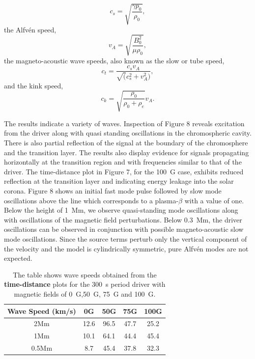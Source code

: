 \documentclass[physics,article,submit,pdftex,moreauthors]{Definitions/mdpi}
\begin{document}
\begin{equation}
 c_{s}  =    \sqrt{\frac{\gamma p_0}{\rho_0}}, 
\label{e10}
\end{equation}
the Alfvén speed,
\begin{equation}
 v_{A}  =    \sqrt{\frac{B_{0}^{2}}{\mu\rho_{0}}},  
\label{e11}
\end{equation}
the magneto-acoustic wave speeds, also known as  the slow or tube speed,
\begin{equation}
 c_{t}  =    \frac{c_s v_A}{\sqrt(c_s^2+v_A^2)}, 
\label{e12}
\end{equation}
and the kink speed,
\begin{equation}
 c_{k}  =    \sqrt{\frac{\rho_0}{\rho_0+\rho_e}}v_A.
\label{e12}
\end{equation}

The results indicate a variety of waves. Inspection of Figure 8 reveals excitation from the driver along with quasi standing oscillations in the chromospheric cavity. There is also partial reflection of the signal at the boundary of the chromosphere and the transition layer. The results also display evidence for signals propagating horizontally at the transition region and with frequencies similar to that of the driver. The time-distance plot in Figure 7, for the 100~G case, exhibits reduced reflection at the transition layer and indicating energy leakage into the solar corona. Figure 8 shows an initial fast mode pulse followed by slow mode oscillations above the line which corresponds to a plasma-$\beta$ with a value of one. Below the height of 1~Mm, we observe quasi-standing mode oscillations along with oscillations of the magnetic field perturbations. Below 0.3~Mm, the driver oscillations can be observed in conjunction with possible magneto-acoustic slow mode oscillations. Since the source terms perturb only the vertical component of the velocity and the model is cylindrically symmetric, pure Alfv\'en modes are not expected.



\begin{table}\label{wavespeeds}
\centering
\begin{tabular}{c c c c c}
\hline
Wave Speed (km/s)   &  0G  &  50G &  75G & 100G\\
\hline
2Mm & 12.6  &   96.5       &   47.7      &  25.2     \\
\hline
1Mm & 10.1  &    64.1      &   44.4     &   45.4      \\
\hline
0.5Mm & 8.7  &   45.4      &   37.8      &   32.3    \\
\hline

\end{tabular} 
\caption{The table shows wave speeds obtained from the {\bf time-distance} plots for the 300~s period driver with magnetic fields of 0~G,50~G, 75~G and 100~G.}
\label{Tablewavespeeds_300s}
\end{table}
\end{document}
